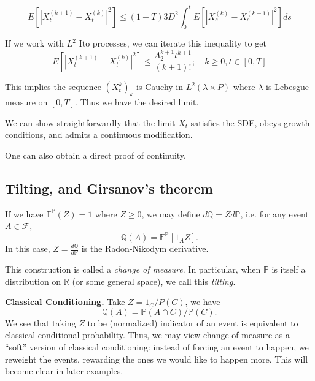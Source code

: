 \[
E\left[\left|X_t^{(k+1)}-X_t^{(k)}\right|^2\right] \leq(1+T) 3 D^2 \int_0^t E\left[\left|X_s^{(k)}-X_s^{(k-1)}\right|^2\right] d s
\]

If we work with $L^2$ Ito processes, we can iterate this inequality to get 
\[
E\left[\left|X_t^{(k+1)}-X_t^{(k)}\right|^2\right] \leq \frac{A_2^{k+1} t^{k+1}}{(k+1)!} ; \quad k \geq 0, t \in[0, T]
\]

This implies the sequence $(X_t^{k})_k$ is Cauchy in $L^2(\lambda \times P)$ where $\lambda$ is Lebesgue measure on $[0,T]$. Thus we have the desired limit. 

We can show straightforwardly that the limit $X_t$ satisfies the SDE, obeys growth conditions, and admits a continuous modification.

One can also obtain a direct proof of continuity.


\subsection{Tilting, and Girsanov's theorem}

\begin{definition}
	If we have $\mathbb{E}^{\mathbb{P}}(Z) = 1$ where $Z\geq 0$, we may define $d \mathbb{Q} = Z d \mathbb{P}$, i.e. for any event $A \in \mathcal{F}$,
	\[
		\mathbb{Q}(A) =  \mathbb{E}^\mathbb{P}\left[ 1_A Z \right] 
	.\] 
	In this case, $Z =  \frac{d \mathbb{Q}}{d \mathbb{P}}$ is the Radon-Nikodym derivative.
	
	This construction is called a \textit{change of measure}. In particular, when $\mathbb{P}$ is itself a distribution on $\mathbb{R}$ (or some general space), we call this \textit{tilting}.
\end{definition}

\begin{example}
	\textbf{Classical Conditioning.}
	Take $Z = 1_C / P(C)$, we have
	\[
		\mathbb{Q}(A) = \mathbb{P}(A \cap C) / \mathbb{P}(C)
	.\] 
	We see that taking $Z$ to be (normalized) indicator of an event is equivalent to classical conditional probability. Thus, we may view change of measure as a ``soft'' version of classical conditioning: instead of forcing an event to happen, we reweight the events, rewarding the ones we would like to happen more. This will become clear in later examples.
\end{example}


